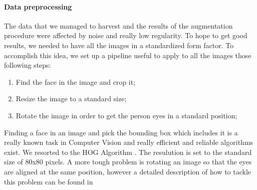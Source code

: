 \paragraph{Data preprocessing}
The data that we managed to harvest and the results of the augmentation procedure were affected by noise and really low regularity. To hope to get good results, we needed to have all the images in a standardized form factor. To accomplish this idea, we set up a pipeline useful to apply to all the images those following steps:

\begin{enumerate}
\item Find the face in the image and crop it;
\item Resize the image to a standard size;
\item Rotate the image in order to get the person eyes in a standard position;
\end{enumerate}

Finding a face in an image and pick the bounding box which includes it is a really known task in Computer Vision and really efficient and reliable algorithms exist. We resorted to the HOG Algorithm \cite{hog}. The resulution is set to the standard size of 80x80 pixels. A more tough problem is rotating an image so that the eyes are aligned at the same position, however a detailed description of how to tackle this problem can be found in \cite{facealign}

